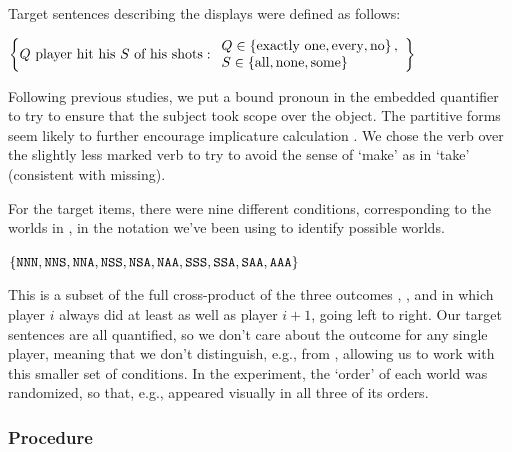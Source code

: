 \documentclass[leqno,12pt]{article}
\begin{document}
Target sentences describing the displays were defined as follows:
%
\begin{examples}
\item\label{expmsgs} 
    $\left\{ 
      \text{$Q$ player hit his $S$ of his shots} :
      \begin{array}{l}        
        Q \in \left\{ \text{exactly one}, \text{every}, \text{no} \right\}, \\
        S \in \left\{ \text{all}, \text{none}, \text{some} \right\}
      \end{array} \right\}$
\end{examples}
%
Following previous studies, we put a bound pronoun in the embedded
quantifier to try to ensure that the subject took scope over the
object. The partitive forms seem likely to further encourage
implicature calculation \citep{Grodner-etal:2010}. We chose the verb
 over the slightly less marked verb  to try to
avoid the sense of `make' as in `take' (consistent with missing).

For the target items, there were nine different conditions,
corresponding to the worlds in , in the notation we've been
using to identify possible worlds.
%
\begin{examples}
\item\label{conds} $\left\{ \texttt{NNN}, \texttt{NNS}, \texttt{NNA},
    \texttt{NSS}, \texttt{NSA}, \texttt{NAA}, \texttt{SSS}, \texttt{SSA},
    \texttt{SAA}, \texttt{AAA} \right\}$
\end{examples}


This is a subset of the full cross-product of the three outcomes
, , and  in which player $i$ always did at
least as well as player $i+1$, going left to right.  Our target
sentences are all quantified, so we don't care about the outcome for
any single player, meaning that we don't distinguish, e.g.,
 from , allowing us to work with this smaller
set of conditions. In the experiment, the `order' of each world was
randomized, so that, e.g.,  appeared visually in all three
of its orders.  




\subsubsection{Procedure} 
\end{document}
